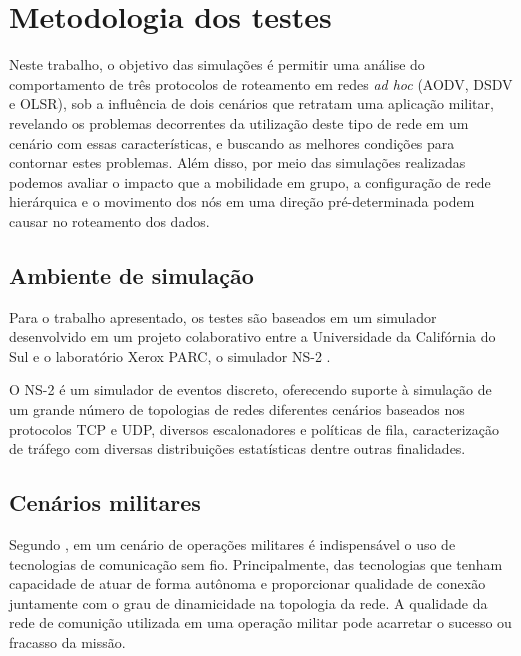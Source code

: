\section{Metodologia dos testes} 
Neste trabalho, o objetivo das simula\c{c}\~oes \'e permitir uma an\'alise do comportamento de tr\^es protocolos de roteamento em redes \textit{ad hoc} (AODV, DSDV e OLSR), sob a influ\^encia de dois cen\'arios que retratam uma aplica\c{c}\~ao militar, revelando os problemas decorrentes da utiliza\c{c}\~ao deste tipo de rede em um cen\'ario com essas caracter\'isticas, e buscando as melhores condi\c{c}\~oes para contornar estes problemas. 
Al\'em disso, por meio das simula\c{c}\~oes realizadas podemos avaliar o impacto que a mobilidade em grupo, a configura\c{c}\~ao de rede hier\'arquica e o movimento dos n\'os em uma dire\c{c}\~ao pr\'e-determinada podem causar no roteamento dos dados.

\subsection{Ambiente de simula\c{c}\~ ao}
Para o trabalho apresentado, os testes s\~ao baseados em um simulador desenvolvido em um projeto colaborativo entre a Universidade da Calif\'ornia do Sul e o laborat\'orio Xerox PARC, o simulador NS-2 \cite{FallVaradhan}.

O NS-2 \'e um simulador de eventos discreto, oferecendo suporte \`a simula\c{c}\~ao de um grande n\'umero de topologias de redes diferentes cen\'arios baseados nos protocolos TCP e UDP, diversos escalonadores e pol\'iticas de fila, caracteriza\c{c}\~ao de tr\'afego com diversas distribui\c{c}\~oes estat\'isticas dentre outras finalidades.

\subsection{Cen\'arios militares}
Segundo \cite{pereira}, em um cen\'ario de opera\c{c}\~oes militares \'e indispens\'avel o uso de tecnologias de comunica\c{c}\~ao sem fio. 
Principalmente, das tecnologias que tenham capacidade de atuar de forma aut\^onoma e proporcionar qualidade de conex\~ao juntamente com o grau de dinamicidade na topologia da rede.
A qualidade da rede de comuni\c{c}\~ao utilizada em uma opera\c{c}\~ao militar pode acarretar o sucesso ou fracasso da miss\~ao.


